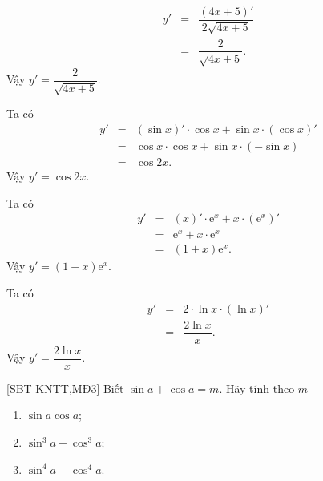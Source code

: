 \begin{bt}
{\begin{listEX}
			\allowdisplaybreaks
			\begin{eqnarray*}
				y'&=&\dfrac{(4x+5)'}{2\sqrt{4x+5}}\\
				&=&\dfrac{2}{\sqrt{4x+5}}.
			\end{eqnarray*}
			Vậy $y'=\dfrac{2}{\sqrt{4x+5}}$.
			\item[d)] Ta có 
			\allowdisplaybreaks
			\begin{eqnarray*}
				y'&=&\left( \sin x\right)'  \cdot \cos x + \sin x \cdot \left( \cos x\right) '\\
				&=& \cos x \cdot \cos x + \sin x \cdot \left( -\sin x \right) \\
				&=&\cos2x.
			\end{eqnarray*}
			Vậy $y'=\cos2x$.
			\item[e)] Ta có 
			\allowdisplaybreaks
			\begin{eqnarray*}
				y'&=&\left( x\right)' \cdot \mathrm{e}^x + x \cdot \left( \mathrm{e}^x\right) '\\
				&=& \mathrm{e}^x + x \cdot \mathrm{e}^x \\
				&=&\left( 1+x\right) \mathrm{e}^x.
			\end{eqnarray*}
			Vậy $y'=\left( 1+x\right) \mathrm{e}^x.$
			\item[f)] Ta có 
			\allowdisplaybreaks
			\begin{eqnarray*}
				y'&=&2\cdot \ln x \cdot \left(\ln x \right)' \\
				&=& \dfrac{2 \ln x}{x}.
			\end{eqnarray*}
			Vậy $y'=\dfrac{2 \ln x}{x}.$
	\end{listEX}}
\end{bt}

\begin{bt}%
[SBT KNTT,MĐ3]
	Biết $\sin a+\cos a=m$. Hãy tính theo $m$
	\begin{enumerate}
		\item $\sin a\cos a$;
		\item $\sin^3a+\cos^3a$;
		\item $\sin^4a+\cos^4a$.
	\end{enumerate}
\end{bt}

